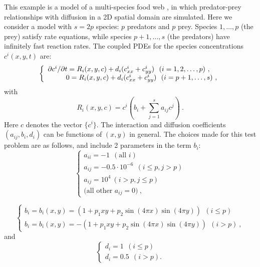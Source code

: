This example is a model of a multi-species food web \cite{Br86}, in
which predator-prey relationships with diffusion in a 2D spatial
domain are simulated.  Here we consider a model with $s = 2p$ species:
$p$ predators and $p$ prey.  Species $1,\ldots, p$ (the prey) satisfy
rate equations, while species $p+1,\ldots, s$ (the predators) have
infinitely fast reaction rates.  The coupled PDEs for the species
concentrations $c^i(x,y,t)$ are:
\begin{equation}
\left\{ \begin{array}{l}
               \partial c^i / \partial t = R_i(x,y,c) + d_i 
( c^i_{xx} + c^i_{yy} ) ~ ~ (i = 1,2,\ldots,p) ~, \\
                \hspace*{.36in}        0 = R_i(x,y,c) + d_i 
( c^i_{xx} + c^i_{yy} ) ~ ~ (i = p+1,\ldots,s) ~,
\end{array} \right.                                       \label{ppsys}
\end{equation}
with
\[
R_i(x,y,c) = c^i (b_i + \sum_{j=1}^s a_{ij} c^j) ~.
\]
Here $c$ denotes the vector $\{c^i\}$.
The interaction and diffusion coefficients $(a_{ij},b_i,d_i)$ can be
functions of $(x,y)$ in general. The choices made for this test
problem are as follows, and include 2 parameters in the term $b_i$:
\[
\left\{ \begin{array}{l}
a_{ii} = -1 ~ ~ (\mbox{all } i) \\
a_{ij} = -0.5 \cdot 10^{-6} ~ ~ ( i \leq p , j > p ) \\
a_{ij} = 10^4 ~ ( i > p , j \leq p ) \\
\mbox{(all other } a_{ij} = 0 ) ~,
\end{array} \right.
\]

\[
\left\{ \begin{array}{l}
b_i = b_i(x,y) =  (1 + p_1 xy + p_2 \sin(4\pi x)\sin(4\pi y) )
                   ~~ ( i \leq p ) \\
b_i = b_i(x,y) = -(1 + p_1 xy + p_2 \sin(4\pi x)\sin(4\pi y) )
                   ~~ ( i > p ) ~,
\end{array} \right.
\]
and
\[
\left\{ \begin{array}{l}
d_i =   1 ~ ~ ( i \leq p ) \\
d_i = 0.5 ~ ~ ( i > p ) .
\end{array} \right.
\]

